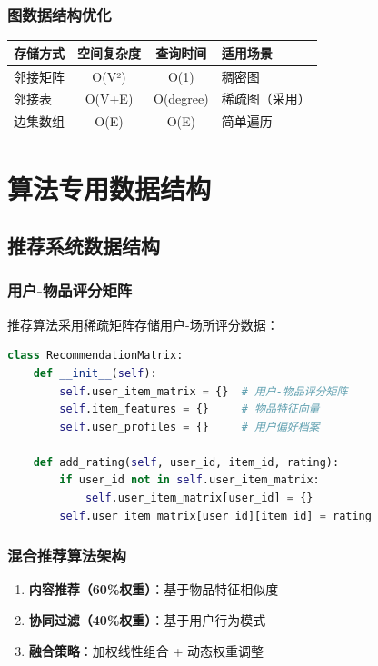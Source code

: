 \documentclass[12pt,a4paper]{article}
\begin{document}
\subsubsection{图数据结构优化}
\begin{table}[H]
\centering
\begin{tabular}{|l|c|c|l|}
\hline
\textbf{存储方式} & \textbf{空间复杂度} & \textbf{查询时间} & \textbf{适用场景} \\
\hline
邻接矩阵 & O(V²) & O(1) & 稠密图 \\
邻接表 & O(V+E) & O(degree) & 稀疏图（采用） \\
边集数组 & O(E) & O(E) & 简单遍历 \\
\hline
\end{tabular}
\end{table}

\section{算法专用数据结构}

\subsection{推荐系统数据结构}

\subsubsection{用户-物品评分矩阵}
推荐算法采用稀疏矩阵存储用户-场所评分数据：

\begin{lstlisting}[language=python, caption={推荐系统数据结构}]
class RecommendationMatrix:
    def __init__(self):
        self.user_item_matrix = {}  # 用户-物品评分矩阵
        self.item_features = {}     # 物品特征向量
        self.user_profiles = {}     # 用户偏好档案
        
    def add_rating(self, user_id, item_id, rating):
        if user_id not in self.user_item_matrix:
            self.user_item_matrix[user_id] = {}
        self.user_item_matrix[user_id][item_id] = rating
\end{lstlisting}

\subsubsection{混合推荐算法架构}
\begin{enumerate}
    \item \textbf{内容推荐（60\%权重）}：基于物品特征相似度
    \item \textbf{协同过滤（40\%权重）}：基于用户行为模式
    \item \textbf{融合策略}：加权线性组合 + 动态权重调整
\end{enumerate}
\end{document}
